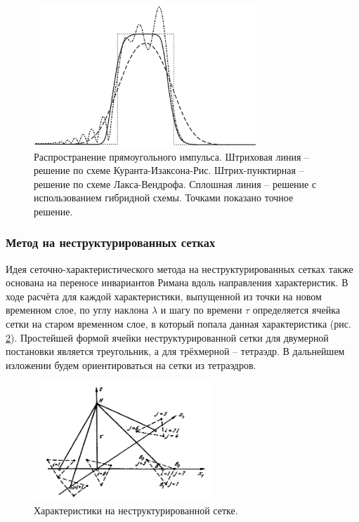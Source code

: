 \begin{figure}[h]
\centerline{\includegraphics[width=0.75\textwidth]{png/hybrid-scheme-testing.png}}
\caption{Распространение прямоугольного импульса. Штриховая линия -- решение по схеме Куранта-Изаксона-Рис. Штрих-пунктирная -- решение по схеме Лакса-Вендрофа. Сплошная линия -- решение с использованием гибридной схемы. Точками показано точное решение.}
\label{pic:hybrid-scheme-testing}
\end{figure}

\subsubsection{Метод на неструктурированных сетках}

Идея сеточно-характеристического метода на неструктурированных сетках также основана на переносе инвариантов Римана вдоль направления характеристик. В ходе расчёта для каждой характеристики, выпущенной из точки на новом временном слое, по углу наклона $\lambda$ и шагу по времени $\tau$ определяется ячейка сетки на старом временном слое, в который попала данная характеристика (рис. \ref{pic:gcm_2d}). Простейшей формой ячейки неструктурированной сетки для двумерной постановки является треугольник, а для трёхмерной -- тетраэдр. В дальнейшем изложении будем ориентироваться на сетки из тетраэдров.

\begin{figure}[h]
\centering
\includegraphics[width=0.6\textwidth]{png/characteristics-2d-triangles-inner.png}
\caption{Характеристики на неструктурированной сетке.}
\label{pic:gcm_2d}
\end{figure}

